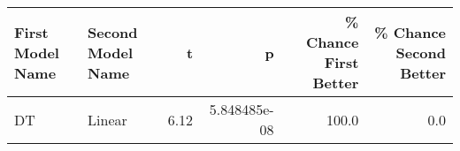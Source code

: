 \begin{tabular}{llrrrr}
\toprule
First Model Name & Second Model Name &    t &            p &  \% Chance First Better &  \% Chance Second Better \\
\midrule
              DT &            Linear & 6.12 & 5.848485e-08 &                  100.0 &                     0.0 \\
\bottomrule
\end{tabular}
